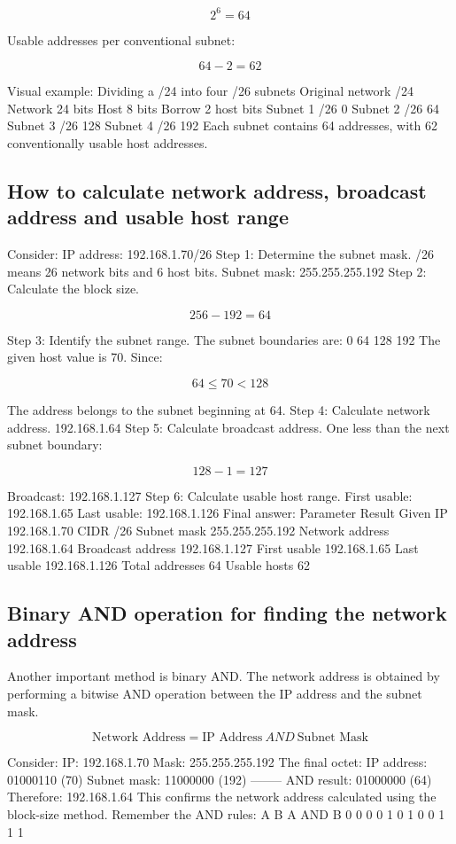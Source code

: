 \[
2^6=64
\]

Usable addresses per conventional subnet:

\[
64-2=62
\]

Visual example: Dividing a /24 into four /26 subnets
Original network
/24
Network
24 bits
Host
8 bits
Borrow 2 host bits
Subnet 1
/26
0
Subnet 2
/26
64
Subnet 3
/26
128
Subnet 4
/26
192
Each subnet contains 64 addresses, with 62 conventionally usable host addresses.
\subsection{How to calculate network address, broadcast address and usable host range}
Consider:
IP address: 192.168.1.70/26
Step 1: Determine the subnet mask.
/26 means 26 network bits and 6 host bits.
Subnet mask:
255.255.255.192
Step 2: Calculate the block size.

\[
256-192=64
\]

Step 3: Identify the subnet range.
The subnet boundaries are:
0
64
128
192
The given host value is 70.
Since:

\[
64\leq70<128
\]

The address belongs to the subnet beginning at 64.
Step 4: Calculate network address.
192.168.1.64
Step 5: Calculate broadcast address.
One less than the next subnet boundary:

\[
128-1=127
\]

Broadcast:
192.168.1.127
Step 6: Calculate usable host range.
First usable:
192.168.1.65
Last usable:
192.168.1.126
Final answer:
Parameter
Result
Given IP
192.168.1.70
CIDR
/26
Subnet mask
255.255.255.192
Network address
192.168.1.64
Broadcast address
192.168.1.127
First usable
192.168.1.65
Last usable
192.168.1.126
Total addresses
64
Usable hosts
62
\subsection{Binary AND operation for finding the network address}
Another important method is binary AND.
The network address is obtained by performing a bitwise AND operation between the IP address and the subnet mask.

\[
\boxed{\text{Network Address}=\text{IP Address}\ AND\ \text{Subnet Mask}}
\]

Consider:
IP: 192.168.1.70
Mask: 255.255.255.192
The final octet:
IP address: 01000110 (70) Subnet mask: 11000000 (192) -------- AND result: 01000000 (64)
Therefore:
192.168.1.64
This confirms the network address calculated using the block-size method.
Remember the AND rules:
A
B
A AND B
0
0
0
0
1
0
1
0
0
1
1
1
